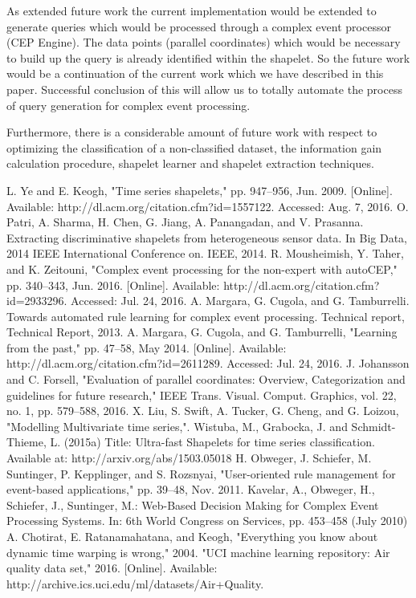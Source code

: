 \documentclass[letterpaper, 10 pt, conference]{IEEEtran}  %
\begin{document}
As extended future work the current implementation would be extended to generate queries which would be processed through a complex event processor (CEP Engine). The data points (parallel coordinates) which would be necessary to build up the query is already identified within the shapelet. So the future work would be a continuation of the current work which we have described in this paper. Successful conclusion of this will allow us to totally automate the process of query generation for complex event processing. 

Furthermore, there is a considerable amount of future work with respect to optimizing the classification of a non-classified dataset, the information gain calculation procedure, shapelet learner and shapelet extraction techniques. 
 

\begin{thebibliography}{99}

 L. Ye and E. Keogh, "Time series shapelets," pp. 947–956, Jun. 2009. [Online]. Available: http://dl.acm.org/citation.cfm?id=1557122. Accessed: Aug. 7, 2016.
 O. Patri, A. Sharma, H. Chen, G. Jiang, A. Panangadan, and V. Prasanna. Extracting discriminative shapelets from heterogeneous sensor data. In Big Data, 2014 IEEE International Conference on. IEEE, 2014.
 R. Mousheimish, Y. Taher, and K. Zeitouni, "Complex event processing for the non-expert with autoCEP," pp. 340–343, Jun. 2016. [Online]. Available: http://dl.acm.org/citation.cfm?id=2933296. Accessed: Jul. 24, 2016.
 A. Margara, G. Cugola, and G. Tamburrelli. Towards automated rule learning for complex event processing. Technical report, Technical Report, 2013.
 A. Margara, G. Cugola, and G. Tamburrelli, "Learning from the past," pp. 47–58, May 2014. [Online]. Available: http://dl.acm.org/citation.cfm?id=2611289. Accessed: Jul. 24, 2016.
 J. Johansson and C. Forsell, "Evaluation of parallel coordinates: Overview, Categorization and guidelines for future research," IEEE Trans. Visual. Comput. Graphics, vol. 22, no. 1, pp. 579–588, 2016.
 X. Liu, S. Swift, A. Tucker, G. Cheng, and G. Loizou, "Modelling Multivariate time series,". 
 Wistuba, M., Grabocka, J. and Schmidt-Thieme, L. (2015a) Title: Ultra-fast Shapelets for time series classification. Available at: http://arxiv.org/abs/1503.05018
 H. Obweger, J. Schiefer, M. Suntinger, P. Kepplinger, and S. Rozsnyai, "User-oriented rule management for event-based applications," pp. 39–48, Nov. 2011. 
 Kavelar, A., Obweger, H., Schiefer, J., Suntinger, M.: Web-Based Decision Making for Complex Event Processing Systems. In: 6th World Congress on Services, pp. 453–458 (July 2010)
 A. Chotirat, E. Ratanamahatana, and Keogh, "Everything you know about dynamic time warping is wrong," 2004.
 "UCI machine learning repository: Air quality data set," 2016. [Online]. Available: http://archive.ics.uci.edu/ml/datasets/Air+Quality.


\end{thebibliography}
\end{document}
